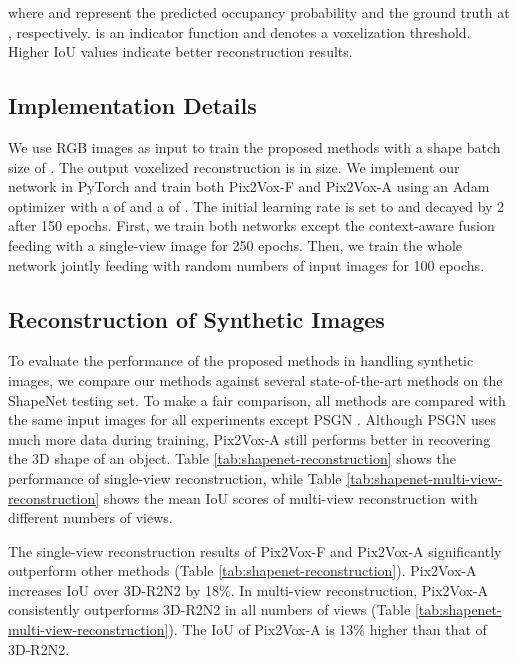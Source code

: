 \documentclass[10pt,twocolumn,letterpaper]{article}
\begin{document}
where  and  represent the predicted occupancy probability and the ground truth at , respectively.
 is an indicator function and  denotes a voxelization threshold.
Higher IoU values indicate better reconstruction results.

\subsection{Implementation Details}

We use  RGB images as input to train the proposed methods with a shape batch size of .
The output voxelized reconstruction is  in size.
We implement our network in PyTorch \cite{DBLP:conf/nips/AdamSSGEZZALA17} and train both Pix2Vox-F and Pix2Vox-A using an Adam optimizer \cite{DBLP:conf/iclr/KingmaB15} with a  of  and a  of .
The initial learning rate is set to  and decayed by 2 after 150 epochs.
First, we train both networks except the context-aware fusion feeding with a single-view image for 250 epochs.
Then, we train the whole network jointly feeding with random numbers of input images for 100 epochs.


\subsection{Reconstruction of Synthetic Images}
\label{sec:shapenet-reconstruction}

To evaluate the performance of the proposed methods in handling synthetic images, we compare our methods against several state-of-the-art methods on the ShapeNet testing set.
To make a fair comparison, all methods are compared with the same input images for all experiments except PSGN \cite{DBLP:conf/cvpr/FanSG17}.
Although PSGN uses much more data during training, Pix2Vox-A still performs better in recovering the 3D shape of an object.
Table \ref{tab:shapenet-reconstruction} shows the performance of single-view reconstruction, while Table \ref{tab:shapenet-multi-view-reconstruction} shows the mean IoU scores of multi-view reconstruction with different numbers of views.

The single-view reconstruction results of Pix2Vox-F and Pix2Vox-A significantly outperform other methods (Table \ref{tab:shapenet-reconstruction}).
Pix2Vox-A increases IoU over 3D-R2N2 by 18\%. 
In multi-view reconstruction, Pix2Vox-A consistently outperforms 3D-R2N2 in all numbers of views (Table \ref{tab:shapenet-multi-view-reconstruction}). 
The IoU of Pix2Vox-A is 13\% higher than that of 3D-R2N2.
\end{document}
